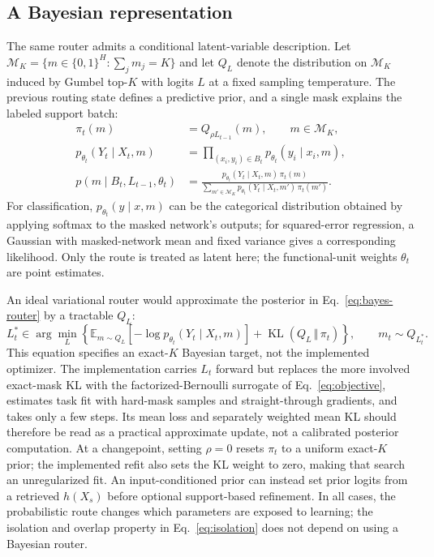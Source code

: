 \documentclass[11pt]{article}
\newcommand{\KL}{\operatorname{KL}}
\begin{document}
\subsection*{A Bayesian representation}
The same router admits a conditional latent-variable description. Let
$\mathcal{M}_K=\{m\in\{0,1\}^H:\sum_jm_j=K\}$ and let $Q_L$ denote the
distribution on $\mathcal{M}_K$ induced by Gumbel top-$K$ with logits $L$
at a fixed sampling temperature.
The previous routing state defines a predictive prior, and a single mask
explains the labeled support batch:
\begin{align}
 \pi_t(m)&=Q_{\rho L_{t-1}}(m),\qquad m\in\mathcal{M}_K,\nonumber\\
 p_{\theta_t}(Y_t\mid X_t,m)
   &=\prod_{(x_i,y_i)\in B_t}p_{\theta_t}(y_i\mid x_i,m),\nonumber\\
 p(m\mid B_t,L_{t-1},\theta_t)
   &=\frac{p_{\theta_t}(Y_t\mid X_t,m)\,\pi_t(m)}
     {\sum_{m'\in\mathcal{M}_K}
       p_{\theta_t}(Y_t\mid X_t,m')\,\pi_t(m')}.
 \label{eq:bayes-router}
\end{align}
For classification, $p_{\theta_t}(y\mid x,m)$ can be the categorical
distribution obtained by applying softmax to the masked network's outputs;
for squared-error regression, a Gaussian with masked-network mean and fixed
variance gives a corresponding likelihood. Only the route is treated as
latent here; the functional-unit weights $\theta_t$ are point estimates.

An ideal variational router would approximate the posterior in
Eq.~\eqref{eq:bayes-router} by a tractable $Q_L$:
\begin{equation}
 L_t^*\in\arg\min_L\left\{
 \mathbb{E}_{m\sim Q_L}\!\left[-\log p_{\theta_t}(Y_t\mid X_t,m)\right]
 +\KL\!\left(Q_L\,\Vert\,\pi_t\right)\right\},
 \qquad m_t\sim Q_{L_t^*}.
 \label{eq:variational-router}
\end{equation}
This equation specifies an exact-$K$ Bayesian target, not the implemented
optimizer. The implementation carries $L_t$ forward but replaces the
more involved exact-mask KL with the factorized-Bernoulli
surrogate of Eq.~\eqref{eq:objective}, estimates task fit with hard-mask
samples and straight-through gradients, and takes only a few steps. Its
mean loss and separately weighted mean KL should therefore be read as a
practical approximate update, not a calibrated posterior computation.
At a changepoint, setting $\rho=0$ resets $\pi_t$ to a uniform exact-$K$
prior; the implemented refit also sets the KL weight to zero, making that
search an unregularized fit. An input-conditioned prior can instead set prior logits from a
retrieved $h(X_s)$ before optional support-based refinement. In all cases,
the probabilistic route changes which parameters are exposed to learning;
the isolation and overlap property in Eq.~\eqref{eq:isolation} does not
depend on using a Bayesian router.
\end{document}
